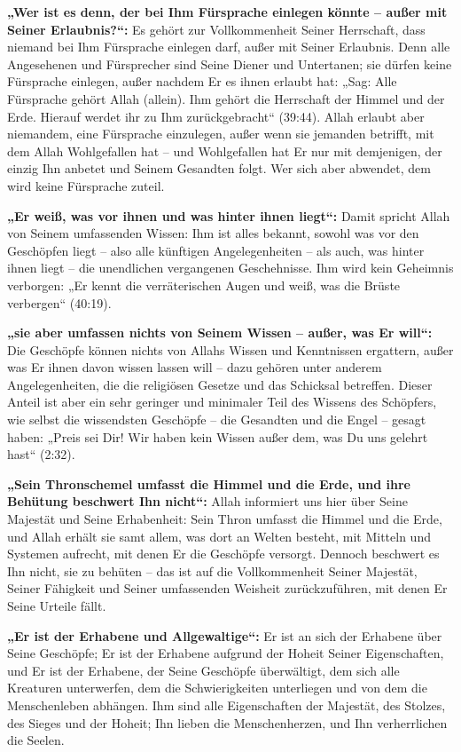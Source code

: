 \textbf{„Wer ist es denn, der bei Ihm Fürsprache einlegen könnte – außer mit Seiner Erlaubnis?“:}
Es gehört zur Vollkommenheit Seiner Herrschaft, dass niemand bei Ihm Fürsprache einlegen darf,
außer mit Seiner Erlaubnis. Denn alle Angesehenen und Fürsprecher sind Seine Diener und
Untertanen; sie dürfen keine Fürsprache einlegen, außer nachdem Er es ihnen erlaubt hat: „Sag:
Alle Fürsprache gehört Allah (allein). Ihm gehört die Herrschaft der Himmel und der Erde. Hierauf
werdet ihr zu Ihm zurückgebracht“ (39:44). Allah erlaubt aber niemandem, eine Fürsprache
einzulegen, außer wenn sie jemanden betrifft, mit dem Allah Wohlgefallen hat – und Wohlgefallen
hat Er nur mit demjenigen, der einzig Ihn anbetet und Seinem Gesandten folgt. Wer sich aber
abwendet, dem wird keine Fürsprache zuteil.

\textbf{„Er weiß, was vor ihnen und was hinter ihnen liegt“:} Damit spricht Allah von Seinem
umfassenden Wissen: Ihm ist alles bekannt, sowohl was vor den Geschöpfen liegt – also alle
künftigen Angelegenheiten – als auch, was hinter ihnen liegt – die unendlichen vergangenen
Geschehnisse. Ihm wird kein Geheimnis verborgen: „Er kennt die verräterischen Augen und weiß,
was die Brüste verbergen“ (40:19).

\textbf{„sie aber umfassen nichts von Seinem Wissen – außer, was Er will“:} Die Geschöpfe
können nichts von Allahs Wissen und Kenntnissen ergattern, außer was Er ihnen davon wissen
lassen will – dazu gehören unter anderem Angelegenheiten, die die religiösen Gesetze und das
Schicksal betreffen. Dieser Anteil ist aber ein sehr geringer und minimaler Teil des Wissens des
Schöpfers, wie selbst die wissendsten Geschöpfe – die Gesandten und die Engel – gesagt haben:
„Preis sei Dir! Wir haben kein Wissen außer dem, was Du uns gelehrt hast“ (2:32).

\textbf{„Sein Thronschemel umfasst die Himmel und die Erde, und ihre Behütung beschwert Ihn
nicht“:} Allah informiert uns hier über Seine Majestät und Seine Erhabenheit: Sein Thron umfasst
die Himmel und die Erde, und Allah erhält sie samt allem, was dort an Welten besteht, mit Mitteln
und Systemen aufrecht, mit denen Er die Geschöpfe versorgt. Dennoch beschwert es Ihn nicht,
sie zu behüten – das ist auf die Vollkommenheit Seiner Majestät, Seiner Fähigkeit und Seiner
umfassenden Weisheit zurückzuführen, mit denen Er Seine Urteile fällt.

\textbf{„Er ist der Erhabene und Allgewaltige“:} Er ist an sich der Erhabene über Seine Geschöpfe;
Er ist der Erhabene aufgrund der Hoheit Seiner Eigenschaften, und Er ist der Erhabene, der Seine
Geschöpfe überwältigt, dem sich alle Kreaturen unterwerfen, dem die Schwierigkeiten
unterliegen und von dem die Menschenleben abhängen. Ihm sind alle Eigenschaften der Majestät,
des Stolzes, des Sieges und der Hoheit; Ihn lieben die Menschenherzen, und Ihn verherrlichen die
Seelen.

